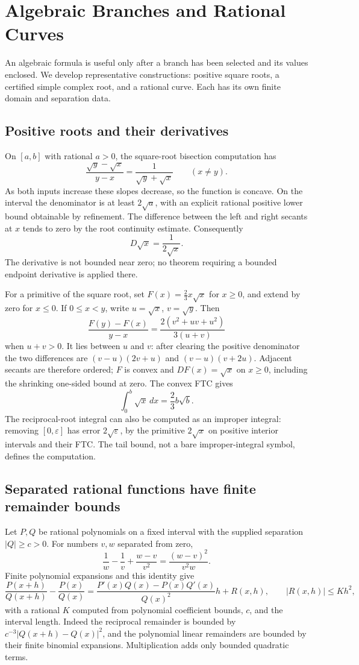 \chapter{Algebraic Branches and Rational Curves}\label{ch:algebra-fta}

An algebraic formula is useful only after a branch has been selected and
its values enclosed.  We develop representative constructions: positive
square roots, a certified simple complex root, and a rational curve.  Each
has its own finite domain and separation data.

\section{Positive roots and their derivatives}
On $[a,b]$ with rational $a>0$, the square-root bisection computation has
\[
 \frac{\sqrt y-\sqrt x}{y-x}
      =\frac1{\sqrt y+\sqrt x}\qquad(x\ne y).
\]
As both inputs increase these slopes decrease, so the function is concave.
On the interval the denominator is at least $2\sqrt a$, with an explicit
rational positive lower bound obtainable by refinement.  The difference
between the left and right secants at $x$ tends to zero by the root
continuity estimate.  Consequently
\[
 D\sqrt x=\frac1{2\sqrt x}.
\]
The derivative is not bounded near zero; no theorem requiring a bounded
endpoint derivative is applied there.

For a primitive of the square root, set $F(x)=\frac23 x\sqrt x$ for
$x\ge0$, and extend by zero for $x\le0$.  If $0\le x<y$, write
$u=\sqrt x$, $v=\sqrt y$.  Then
\[
 \frac{F(y)-F(x)}{y-x}
       =\frac{2(v^2+uv+u^2)}{3(u+v)}
\]
when $u+v>0$.  It lies between $u$ and $v$: after clearing the positive
denominator the two differences are
$(v-u)(2v+u)$ and $(v-u)(v+2u)$.  Adjacent secants are therefore ordered;
$F$ is convex and $DF(x)=\sqrt x$ on $x\ge0$, including the shrinking
one-sided bound at zero.  The convex FTC gives
\[
 \int_0^b\sqrt x\,dx=\frac23 b\sqrt b.
\]
The reciprocal-root integral can also be computed as an improper integral:
removing $[0,\varepsilon]$ has error $2\sqrt\varepsilon$, by the
primitive $2\sqrt x$ on positive interior intervals and their FTC.  The tail bound, not a bare
improper-integral symbol, defines the computation.

\section{Separated rational functions have finite remainder bounds}
Let $P,Q$ be rational polynomials on a fixed interval with the supplied
separation $|Q|\ge c>0$.  For numbers $v,w$ separated from zero,
\[
 \frac1w-\frac1v+\frac{w-v}{v^2}
       =\frac{(w-v)^2}{v^2w}.
\]
Finite polynomial expansions and this identity give
\[
 \frac{P(x+h)}{Q(x+h)}-\frac{P(x)}{Q(x)}
 =\frac{P'(x)Q(x)-P(x)Q'(x)}{Q(x)^2}h+R(x,h),
 \qquad |R(x,h)|\le K h^2,
\]
with a rational $K$ computed from polynomial coefficient bounds, $c$, and
the interval length.  Indeed the reciprocal remainder is bounded by
$c^{-3}|Q(x+h)-Q(x)|^2$, and the polynomial linear remainders are bounded
by their finite binomial expansions.  Multiplication adds only bounded
quadratic terms.

